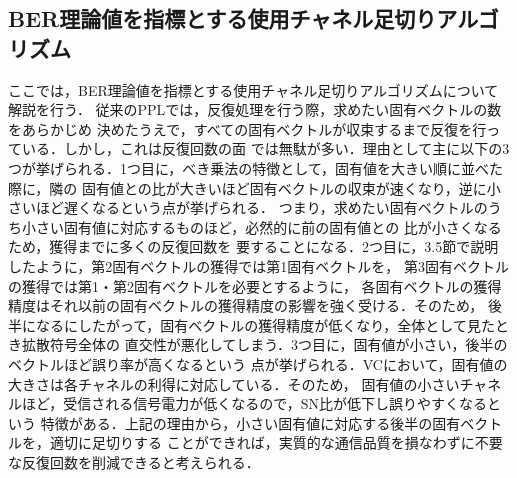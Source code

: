 \subsection{BER理論値を指標とする使用チャネル足切りアルゴリズム}
ここでは，BER理論値を指標とする使用チャネル足切りアルゴリズムについて解説を行う．
従来のPPLでは，反復処理を行う際，求めたい固有ベクトルの数をあらかじめ
決めたうえで，すべての固有ベクトルが収束するまで反復を行っている．しかし，これは反復回数の面
では無駄が多い．理由として主に以下の3つが挙げられる．1つ目に，べき乗法の特徴として，固有値を大きい順に並べた際に，隣の
固有値との比が大きいほど固有ベクトルの収束が速くなり，逆に小さいほど遅くなるという点が挙げられる．
つまり，求めたい固有ベクトルのうち小さい固有値に対応するものほど，必然的に前の固有値との
比が小さくなるため，獲得までに多くの反復回数を
要することになる．2つ目に，3.5節で説明したように，第2固有ベクトルの獲得では第1固有ベクトルを，
第3固有ベクトルの獲得では第1・第2固有ベクトルを必要とするように，
各固有ベクトルの獲得精度はそれ以前の固有ベクトルの獲得精度の影響を強く受ける．そのため，
後半になるにしたがって，固有ベクトルの獲得精度が低くなり，全体として見たとき拡散符号全体の
直交性が悪化してしまう．3つ目に，固有値が小さい，後半のベクトルほど誤り率が高くなるという
点が挙げられる．VCにおいて，固有値の大きさは各チャネルの利得に対応している．そのため，
固有値の小さいチャネルほど，受信される信号電力が低くなるので，SN比が低下し誤りやすくなるという
特徴がある．上記の理由から，小さい固有値に対応する後半の固有ベクトルを，適切に足切りする
ことができれば，実質的な通信品質を損なわずに不要な反復回数を削減できると考えられる．

